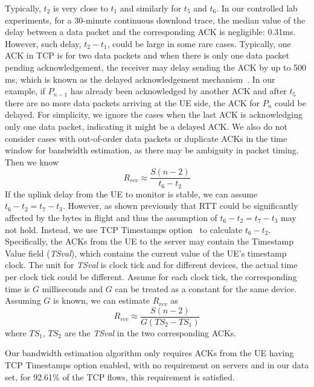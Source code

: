 Typically, $t_{2}$ is very close to $t_{1}$ and similarly for $t_{5}$ and $t_{6}$. In our controlled lab experiments, for a 30-minute continuous download trace, the median value of the delay between a data packet and the corresponding ACK is negligible: 0.31ms. However, such delay, \eg $t_{2} - t_{1}$, could be large in some rare cases. Typically, one ACK in TCP is for two data packets and when there is only one data packet pending acknowledgement, the receiver may delay sending the ACK by up to 500 ms, which is known as the delayed acknowledgement mechanism~\cite{rfc1122}. In our example, if $P_{n-1}$ has already been acknowledged by another ACK and after $t_{5}$ there are no more data packets arriving at the UE side, the ACK for $P_{n}$ could be delayed. For simplicity, we ignore the cases when the last ACK is acknowledging only one data packet, indicating it might be a delayed ACK. We also do not consider cases with out-of-order data packets or duplicate ACKs in the time window for bandwidth estimation, as there may be ambiguity in packet timing. Then we know
\begin{displaymath}
R_{rcv} \approx \frac{S (n - 2)}{t_{6} - t_{2}}
\end{displaymath}
If the uplink delay from the UE to monitor is stable, we can assume $t_{6} - t_{2} = t_{7} - t_{3}$. However, as shown previously that RTT could be significantly affected by the bytes in flight and thus the assumption of $t_{6} - t_{2} = t_{7} - t_{3}$ may not hold. Instead, we use TCP Timestamps option~\cite{rfc1323} to calculate $t_{6} - t_{2}$. Specifically, the ACKs from the UE to the server may contain the Timestamp Value field ({\em TSval}), which contains the current value of the UE's timestamp clock. The unit for {\em TSval} is clock tick and for different devices, the actual time per clock tick could be different. Assume for each clock tick, the corresponding time is $G$ milliseconds and $G$ can be treated as a constant for the same device. Assuming $G$ is known, we can estimate $R_{rcv}$ as
\begin{equation}
\label{eq:rcv}
R_{rcv} \approx \frac{S (n - 2)}{G(TS_{2} - TS_{1})}
\end{equation}
where $TS_{1}$, $TS_{2}$ are the \emph{TSval} in the two corresponding ACKs.

Our bandwidth estimation algorithm only requires ACKs from the UE having TCP Timestamps option enabled, with no requirement on servers and in our data set, for 92.61\% of the TCP flows, this requirement is satisfied.

